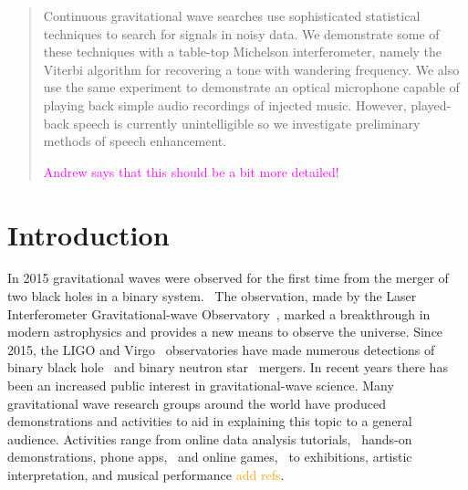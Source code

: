 \documentclass[prb,preprint]{revtex4-1}
\newcommand{\jam}{\textcolor{magenta}}
\newcommand{\han}{\textcolor{orange}}
\begin{document}
\date{\today}

\begin{abstract}
Continuous gravitational wave searches use sophisticated statistical techniques to search for signals in noisy data. We demonstrate some of these techniques with a table-top Michelson interferometer, namely the Viterbi algorithm for recovering a tone with wandering frequency.
We also use the same experiment to demonstrate an optical microphone capable of playing back simple audio recordings of injected music. However, played-back speech is currently unintelligible so we investigate preliminary methods of speech enhancement.
 
\jam{Andrew says that this should be a bit more detailed!}

\end{abstract}

\maketitle

\section{Introduction}
\label{sec:introduction}

In 2015 gravitational waves were observed for the first time from the merger of two black holes in a binary system.~\cite{GW150914} 
The observation, made by the Laser Interferometer Gravitational-wave Observatory~\citep[LIGO]{AdvancedLIGO:2015}, marked a breakthrough in modern astrophysics and provides a new means to observe the universe. 
Since 2015, the LIGO and Virgo~\cite{AdvancedVirgo:2015} observatories have made numerous detections of binary black hole~\cite{GW151226,GW170104,GW170814} and binary neutron star~\cite{GW170817,GW170817multi,GW190425} mergers. 
In recent years there has been an increased public interest in gravitational-wave science. 
Many gravitational wave research groups around the world have produced demonstrations and activities to aid in explaining this topic to a general audience.
Activities range from online data analysis tutorials,~\cite{GWOSC:online,LOSC:2015} hands-on demonstrations, phone apps,~\cite{LaserLabs:online,SciVR:online} and online games,~\cite{BlackHoleHunter:online} to exhibitions,\cite{L2URSSE} artistic interpretation, and musical performance \han{add refs}. 
\end{document}
